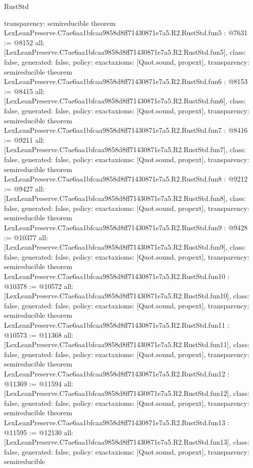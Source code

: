 \begin{lexlean}{RustStd}
\begin{coremodule}
{  transparency: semireducible
}
theorem LexLeanPreserve.C7ae6aa1bfcaa9858d8ff71430871e7a5.R2.RustStd.fun5 : @7631 := @8152 {
  all: [LexLeanPreserve.C7ae6aa1bfcaa9858d8ff71430871e7a5.R2.RustStd.fun5],
  class: false,
  generated: false,
  policy: exact{axioms: [Quot.sound, propext]},
  transparency: semireducible
}
theorem LexLeanPreserve.C7ae6aa1bfcaa9858d8ff71430871e7a5.R2.RustStd.fun6 : @8153 := @8415 {
  all: [LexLeanPreserve.C7ae6aa1bfcaa9858d8ff71430871e7a5.R2.RustStd.fun6],
  class: false,
  generated: false,
  policy: exact{axioms: [Quot.sound, propext]},
  transparency: semireducible
}
theorem LexLeanPreserve.C7ae6aa1bfcaa9858d8ff71430871e7a5.R2.RustStd.fun7 : @8416 := @9211 {
  all: [LexLeanPreserve.C7ae6aa1bfcaa9858d8ff71430871e7a5.R2.RustStd.fun7],
  class: false,
  generated: false,
  policy: exact{axioms: [Quot.sound, propext]},
  transparency: semireducible
}
theorem LexLeanPreserve.C7ae6aa1bfcaa9858d8ff71430871e7a5.R2.RustStd.fun8 : @9212 := @9427 {
  all: [LexLeanPreserve.C7ae6aa1bfcaa9858d8ff71430871e7a5.R2.RustStd.fun8],
  class: false,
  generated: false,
  policy: exact{axioms: [Quot.sound, propext]},
  transparency: semireducible
}
theorem LexLeanPreserve.C7ae6aa1bfcaa9858d8ff71430871e7a5.R2.RustStd.fun9 : @9428 := @10377 {
  all: [LexLeanPreserve.C7ae6aa1bfcaa9858d8ff71430871e7a5.R2.RustStd.fun9],
  class: false,
  generated: false,
  policy: exact{axioms: [Quot.sound, propext]},
  transparency: semireducible
}
theorem LexLeanPreserve.C7ae6aa1bfcaa9858d8ff71430871e7a5.R2.RustStd.fun10 : @10378 := @10572 {
  all: [LexLeanPreserve.C7ae6aa1bfcaa9858d8ff71430871e7a5.R2.RustStd.fun10],
  class: false,
  generated: false,
  policy: exact{axioms: [Quot.sound, propext]},
  transparency: semireducible
}
theorem LexLeanPreserve.C7ae6aa1bfcaa9858d8ff71430871e7a5.R2.RustStd.fun11 : @10573 := @11368 {
  all: [LexLeanPreserve.C7ae6aa1bfcaa9858d8ff71430871e7a5.R2.RustStd.fun11],
  class: false,
  generated: false,
  policy: exact{axioms: [Quot.sound, propext]},
  transparency: semireducible
}
theorem LexLeanPreserve.C7ae6aa1bfcaa9858d8ff71430871e7a5.R2.RustStd.fun12 : @11369 := @11594 {
  all: [LexLeanPreserve.C7ae6aa1bfcaa9858d8ff71430871e7a5.R2.RustStd.fun12],
  class: false,
  generated: false,
  policy: exact{axioms: [Quot.sound, propext]},
  transparency: semireducible
}
theorem LexLeanPreserve.C7ae6aa1bfcaa9858d8ff71430871e7a5.R2.RustStd.fun13 : @11595 := @12130 {
  all: [LexLeanPreserve.C7ae6aa1bfcaa9858d8ff71430871e7a5.R2.RustStd.fun13],
  class: false,
  generated: false,
  policy: exact{axioms: [Quot.sound, propext]},
  transparency: semireducible
}
\end{coremodule}
\end{lexlean}
